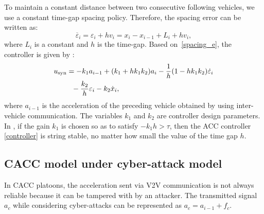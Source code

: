 \documentclass[conference]{IEEEtran}
\begin{document}




 To maintain a constant distance between two consecutive following vehicles, we use a constant time-gap spacing policy. Therefore, the spacing error can be written as: 
\begin{equation} \label{spacing_e}
 \overline{{{\varepsilon}}}_{i}=\varepsilon_{i}+h{v}_{i}=x_{i}-x_{i-1}+L_{i}+h{v}_{i},
\end{equation}
where ${L_i}$ is a constant and $h$ is the time-gap.
Based on~\eqref{spacing_e}, the controller is given by :
\begin{align}\label{controller}
        u_{\text{syn}}&=-k_{1}{a}_{i-1}+(k_{1}+h k_{1}k_{2}){a}_{i}-\frac{1}{h}(1-h k_{1}k_{2})\dot{\varepsilon}_{i}\notag\\
        &~~-\frac{k_{2}}{h}\varepsilon_{i}-k_{2}\dot{x}_{i},
\end{align}
where ${a}_{i-1}$ is the acceleration of the preceding vehicle obtained by using inter-vehicle communication.
The variables $k_1$ and $k_2$ are controller design parameters. In \cite{..}, if the gain $k_1$ is chosen so as to satisfy $-k_{1}h >\tau$, then the ACC controller \eqref{controller} is string 
stable, no matter how small the value of the time gap $h$. 

\subsection{CACC model under cyber-attack model}
In CACC platoons, the acceleration sent via V2V communication is not always reliable because it can be tampered with by an attacker. The transmitted signal $a_{c}$ while considering cyber-attacks can be represented as
$a_{c}={a}_{i-1}+f_{c}$.
\end{document}
